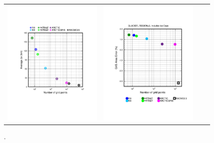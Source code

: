 \documentclass[draft]{agujournal2019}
\begin{document}
\begin{figure}[t]
\begin{center}
\begin{tabular}{cccc}
         \includegraphics[width=60mm]{figs/temp_grisres_dxoverglc.pdf}&
         \includegraphics[width=60mm]{figs/temp_grisres_error.pdf} \\
\end{tabular}
\end{center}
\caption{.}
\label{fig:prect}
\end{figure}
\end{document}
